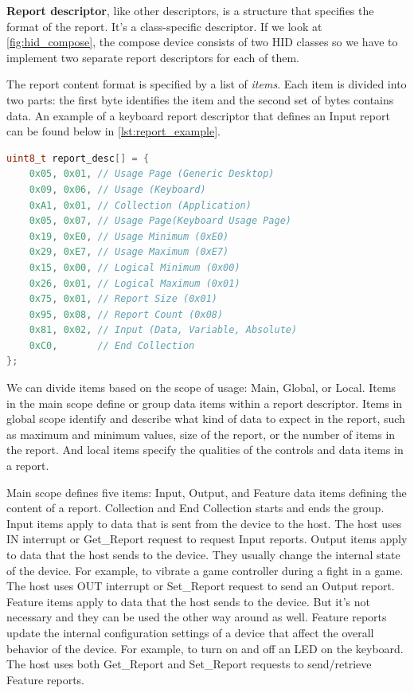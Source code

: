 \textbf{Report descriptor}, like other descriptors, is a structure that specifies the format of the report. It's a class-specific descriptor. If we look at \autoref{fig:hid_compose}, the compose device consists of two HID classes so we have to implement two separate report descriptors for each of them. 

The report content format is specified by a list of \emph{items}. Each item is divided into two parts: the first byte identifies the item and the second set of bytes contains data. An example of a keyboard report descriptor that defines an Input report can be found below in \autoref{lst:report_example}.
\begin{lstlisting}[caption={Example of report descriptor in C language},
                   label={lst:report_example},
                   language=c]
uint8_t report_desc[] = {
    0x05, 0x01, // Usage Page (Generic Desktop)
    0x09, 0x06, // Usage (Keyboard)
    0xA1, 0x01, // Collection (Application)
    0x05, 0x07, // Usage Page(Keyboard Usage Page)
    0x19, 0xE0, // Usage Minimum (0xE0)
    0x29, 0xE7, // Usage Maximum (0xE7)
    0x15, 0x00, // Logical Minimum (0x00)
    0x26, 0x01, // Logical Maximum (0x01)
    0x75, 0x01, // Report Size (0x01)
    0x95, 0x08, // Report Count (0x08)
    0x81, 0x02, // Input (Data, Variable, Absolute)
    0xC0,       // End Collection
};
\end{lstlisting}

We can divide items based on the scope of usage: Main, Global, or Local. Items in the main scope define or group data items within a report descriptor. Items in global scope identify and describe what kind of data to expect in the report, such as maximum and minimum values, size of the report, or the number of items in the report. And local items specify the qualities of the controls and data items in a report. 

Main scope defines five items: Input, Output, and Feature data items defining the content of a report. Collection and End Collection starts and ends the group. Input items apply to data that is sent from the device to the host. The host uses IN interrupt or Get\_Report request to request Input reports. Output items apply to data that the host sends to the device. They usually change the internal state of the device. For example, to vibrate a game controller during a fight in a game. The host uses OUT interrupt or Set\_Report request to send an Output report. Feature items apply to data that the host sends to the device. But it's not necessary and they can be used the other way around as well. Feature reports update the internal configuration settings of a device that affect the overall behavior of the device. For example, to turn on and off an LED on the keyboard. The host uses both Get\_Report and Set\_Report requests to send/retrieve Feature reports.

